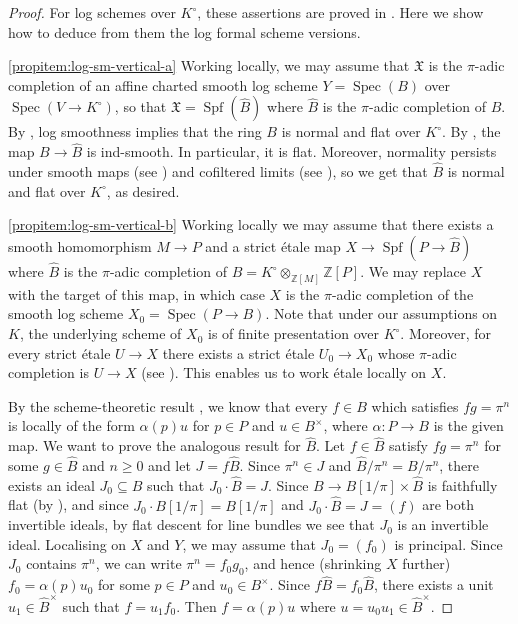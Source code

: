\documentclass[a4paper,twoside,11pt,reqno]{amsart}
\renewcommand{\mathbb}{\mathds}
\newcommand{\bZ}{{\mathbb Z}}
\newcommand{\fX}{{\mathfrak{X}}}
\DeclareMathOperator{\Spec}{Spec}
\DeclareMathOperator{\Spf}{Spf}
\newcommand{\stacks}[2][Tag]{\cite[\href{https://stacks.math.columbia.edu/tag/#2}{#1~#2}]{StacksProject}}
\theoremstyle{definition}
\numberwithin{equation}{subsection}
\begin{document}
\begin{proof}
For log schemes over $K^\circ$, these assertions are proved in \cite[\S5]{AHLS-Log}. Here we show how to deduce from them the log formal scheme versions.

\ref{propitem:log-sm-vertical-a}
Working locally, we may assume that $\fX$ is the $\pi$-adic completion of an affine charted smooth log scheme $Y = \Spec(B)$ over $\Spec(V\to K^\circ)$, so that $\fX = \Spf(\widehat{B})$ where $\widehat{B}$ is the $\pi$-adic completion of $B$. By \cite[Lemma 5.3.4]{AHLS-Log}, log smoothness implies that the ring $B$ is normal and flat over $K^\circ$. 
By \cite[Lemma B.6 + Remark B.7]{GabberZavyalov}, the map $B \to \widehat{B}$ is ind-smooth. In particular, it is flat. Moreover, normality persists under smooth maps (see \stacks[Lemma]{033C}) and cofiltered limits (see \stacks[Lemma]{037D}), so we get that $\widehat{B}$ is normal and flat over $K^\circ$, as desired.


\ref{propitem:log-sm-vertical-b} Working locally we may assume that there exists a smooth homomorphism $M\to P$ and a strict \'etale map $X\to \Spf(P\to \widehat{B})$ where $\widehat{B}$ is the $\pi$-adic completion of $B = K^\circ\otimes_{\bZ[M]}\bZ[P]$. We may replace $X$ with the target of this map, in which case $X$ is the $\pi$-adic completion of the smooth log scheme $X_0 = \Spec(P\to B)$. Note that under our assumptions on $K$, the underlying scheme of $X_0$ is of finite presentation over $K^\circ$. 
Moreover, for every strict \'etale $U\to X$ there exists a strict \'etale $U_0\to X_0$ whose $\pi$-adic completion is $U\to X$ (see \cite[1.7.3]{HuberBook}). This enables us to work \'etale locally on $X$. 

By the scheme-theoretic result \cite[Proposition~5.3.1]{AHLS-Log}, we know that every $f\in B$ which satisfies $fg = \pi^n$ is locally of the form $\alpha(p)u$ for $p\in P$ and $u\in B^\times$, where $\alpha\colon P\to B$ is the given map. We want to prove the analogous result for $\widehat{B}$. Let $f\in \widehat{B}$ satisfy $fg = \pi^n$ for some $g\in \widehat{B}$ and $n\geq 0$ and let $J = f\widehat{B}$. Since $\pi^n\in J$ and $\widehat{B}/\pi^n = B/\pi^n$, there exists an ideal $J_0\subseteq B$ such that $J_0\cdot \widehat{B} = J$. Since $B\to B[1/\pi]\times\widehat{B}$ is faithfully flat (by  \cite[Chapter~0, Proposition~8.2.17]{FujiwaraKato}), and since $J_0\cdot B[1/\pi] = B[1/\pi]$ and $J_0\cdot \widehat{B} = J = (f)$ are both invertible ideals, by flat descent for line bundles we see that $J_0$ is an invertible ideal. Localising on $X$ and $Y$, we may assume that $J_0 = (f_0)$ is principal. Since $J_0$ contains $\pi^n$, we can write $\pi^n = f_0g_0$, and hence (shrinking $X$ further) $f_0 = \alpha(p)u_0$ for some $p\in P$ and $u_0\in B^\times$. Since $f \widehat{B} = f_0\widehat{B}$, there exists a unit $u_1\in \widehat{B}^\times$ such that $f=u_1 f_0$. Then $f = \alpha(p)u$ where $u=u_0u_1\in \widehat{B}^\times$. 


\end{proof}
\end{document}
